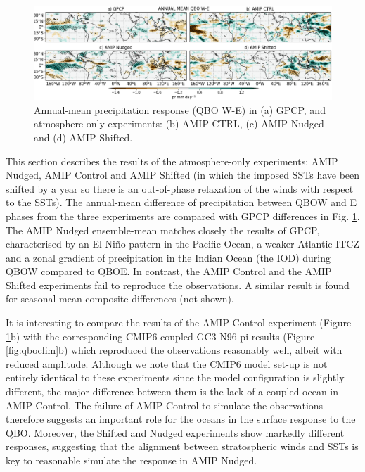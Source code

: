 \begin{figure}[t!]
\centering
 \includegraphics[width=\linewidth]{figures/pr_amip_climqbowqboe.png}
\caption[Annual mean precipitation response in atmosphere-only experiments]{Annual-mean precipitation response (QBO W-E) in (a) GPCP, and atmosphere-only experiments: (b) AMIP CTRL, (c) AMIP Nudged and (d) AMIP Shifted.  }
\label{fig:amip_clim}
\end{figure}

This section describes the results of the atmosphere-only experiments: AMIP Nudged, 
AMIP Control and AMIP Shifted (in which the imposed SSTs have been shifted by a year so there is an out-of-phase relaxation of the winds with respect to the SSTs). The annual-mean difference of precipitation between QBOW and E phases from the three experiments are compared with GPCP differences in Fig. \ref{fig:amip_clim}. The AMIP Nudged ensemble-mean matches closely the results of GPCP, characterised by an El Niño pattern in the Pacific Ocean, a weaker Atlantic ITCZ and a zonal gradient of precipitation in the Indian Ocean (the IOD) during QBOW compared to QBOE. In contrast, the AMIP Control and the AMIP Shifted experiments fail to reproduce the observations. A similar result is found for seasonal-mean composite differences (not shown). 

It is interesting to compare the results of the AMIP Control experiment (Figure \ref{fig:amip_clim}b) with the corresponding CMIP6 coupled GC3 N96-pi results (Figure \ref{fig:qboclim}b) which reproduced the observations reasonably well, albeit with reduced amplitude. Although we note that the CMIP6 model set-up is not entirely identical to these experiments since the model configuration is slightly different, the major difference between them is the lack of a coupled ocean in AMIP Control. The failure of AMIP Control to simulate the observations therefore suggests an important role for the oceans in the surface response to the QBO. 
Moreover, the Shifted and Nudged experiments show markedly different responses, suggesting that the alignment between stratospheric winds and SSTs is key to reasonable simulate the response in AMIP Nudged. 

